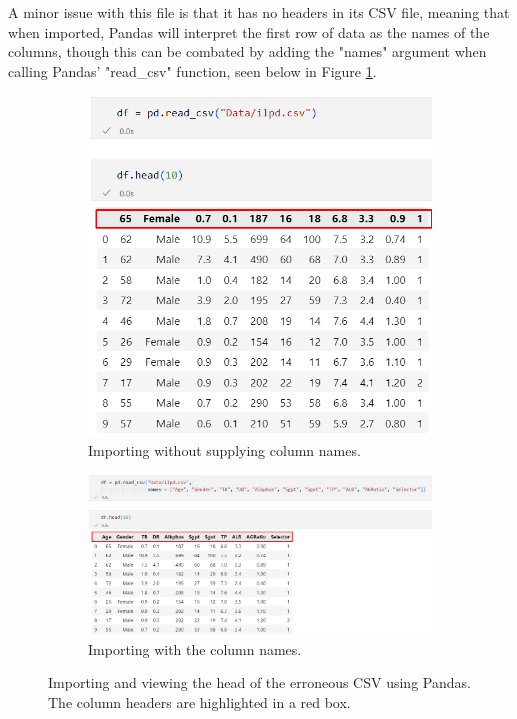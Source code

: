 \documentclass[12pt]{report}
\begin{document}
A minor issue with this file is that it has no headers in its CSV file, meaning that when imported, Pandas will interpret the first 
row of data as the names of the columns, though this can be combated by adding the "names" argument when calling Pandas' "read\_csv" function,
seen below in Figure \ref{fig:pandasNames}. 

\begin{figure}[H]
    \centering
    \begin{subfigure}{0.75\textwidth}
       \includegraphics[width=1\linewidth]{pandasNoNames.png}
       \caption{Importing without supplying column names.}
       \label{fig:pandasNames} 
    \end{subfigure}
    
    \begin{subfigure}{1\textwidth}
       \includegraphics[width=1\linewidth]{pandasNames.png}
       \caption{Importing with the column names.}
       \label{fig:PN2}
    \end{subfigure}
    \caption{Importing and viewing the head of the erroneous CSV using Pandas. The column headers are highlighted in a red box.}
\end{figure}
\end{document}
